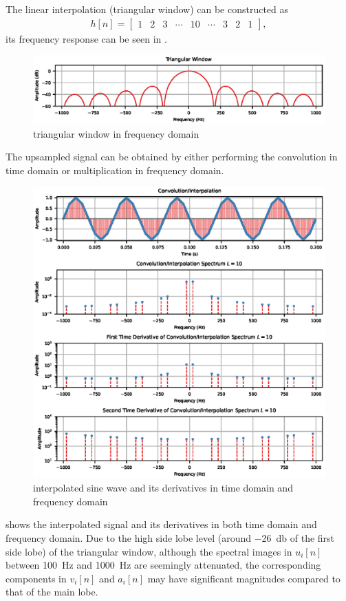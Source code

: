 The linear interpolation (triangular window) can be constructed as
\begin{gather}
h[n]=\begin{bmatrix}
1&2&3&\cdots&10&\cdots&3&2&1
\end{bmatrix},
\end{gather}
its frequency response can be seen in .
\begin{figure}[ht]
\centering
\includegraphics{PIC/TriangularWindow}
\caption{triangular window in frequency domain}\label{fig:tri_window}
\end{figure}

The upsampled signal can be obtained by either performing the convolution in time domain or multiplication in frequency domain.
\begin{figure}[ht]
\centering
\includegraphics{PIC/Convolution}
\caption{interpolated sine wave and its derivatives in time domain and frequency domain}\label{fig:interpolated}
\end{figure}
 shows the interpolated signal and its derivatives in both time domain and frequency domain. Due to the high side lobe level (around \SI{-26}{\decibel} of the first side lobe) of the triangular window, although the spectral images in $u_i[n]$ between \SI{100}{\hertz} and \SI{1000}{\hertz} are seemingly attenuated, the corresponding components in $v_i[n]$ and $a_i[n]$ may have significant magnitudes compared to that of the main lobe.